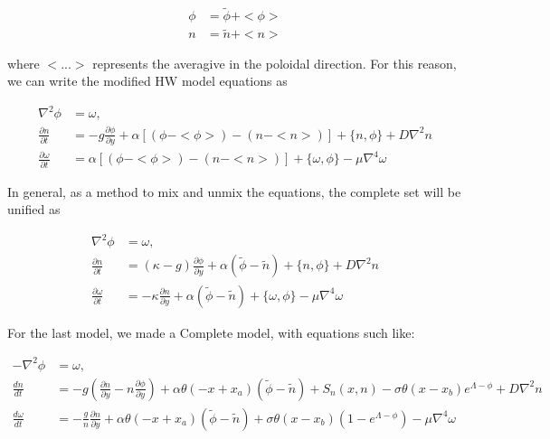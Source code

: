 \documentclass{hitec} %
\begin{document}
\begin{subequations}
\begin{align}
\phi & = \tilde{\phi} + <\phi> \\
n & = \tilde{n} + <n>
\end{align}
\end{subequations}

where $<...>$ represents the averagive in the poloidal direction. For this reason, we can write the modified HW model equations as 

\begin{subequations}
\begin{align}
 \nabla^2 \phi & =  \omega, \quad \\
 \frac{\partial n}{\partial t}    & = - g \frac{\partial \phi}{\partial y} + \alpha [(\phi - <\phi>) - (n - <n>)]
 + \{n, \phi\} + D \nabla^2 n \\
  \frac{\partial \omega}{\partial t} & = \alpha [(\phi - <\phi>) - (n - <n>)]  + \{ \omega, \phi\}
  - \mu\nabla^4\omega
\end{align}
\end{subequations}


In general, as a method to mix and unmix the equations, the complete set will be unified as

\begin{subequations}
\begin{align}
 \nabla^2 \phi & =  \omega, \quad \\
 \frac{\partial n}{\partial t}     & = (\kappa - g) \frac{\partial \phi}{\partial y} + \alpha (\tilde{\phi} - \tilde{n})
 + \{n, \phi\} + D \nabla^2 n \\
  \frac{\partial \omega}{\partial t} & =  - \kappa\frac{\partial n}{\partial y} + \alpha ( \tilde{\phi} - \tilde{n}) + \{ \omega, \phi\}
- \mu\nabla^4\omega
\end{align}
\end{subequations}


For the last model, we made a Complete model, with equations such like:

\begin{subequations}
\begin{align}
 -\nabla^2 \phi & =  \omega, \quad  \\
 \frac{d n}{d t} & = - g \left(\frac{\partial n}{\partial y} - n \frac{\partial \phi}{\partial y}\right) + \alpha\theta(- x + x_a) (\tilde{\phi} - \tilde{n}) + S_n(x, n) - \sigma\theta(x - x_b) e^{\Lambda - \phi} + D \nabla^2 n  \\
  \frac{d \omega}{d  t} & =  - \frac{g}{n}\frac{\partial n}{\partial y} + \alpha\theta(- x + x_a) ( \tilde{\phi} - \tilde{n}) +\sigma\theta(x - x_b)\left(1-e^{\Lambda-\phi}\right) - \mu\nabla^4\omega
\end{align}
\end{subequations}
\end{document}
